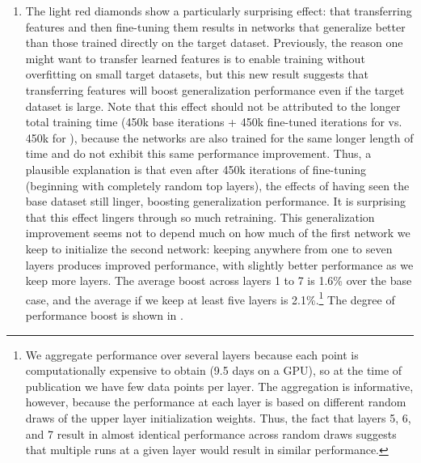 \begin{enumerate}[leftmargin=1.5em]
\item The light red  diamonds show a particularly surprising effect: that transferring features and then fine-tuning them results in networks that generalize better than those trained directly on the target dataset. Previously, the reason one might want to transfer learned features is to enable training without overfitting on small target datasets, but this new result suggests that transferring features will boost generalization performance even if the target dataset is large. Note that this effect should not be attributed to the longer total training time (450k base iterations + 450k fine-tuned iterations for  vs. 450k for ), because the  networks are also trained for the same longer length of time and do not exhibit this same performance improvement. Thus, a plausible explanation is that even after 450k iterations of fine-tuning (beginning with completely random top layers), the effects of having seen the base dataset still linger, boosting generalization performance. It is surprising that this effect lingers through so much retraining. This generalization improvement seems not to depend much on how much of the first network we keep to initialize the second network: keeping anywhere from one to seven layers produces improved performance, with slightly better performance as we keep more layers. The average boost across layers 1 to 7 is 1.6\% over the base case, and the average if we keep at least five layers is 2.1\%.\footnote{We aggregate performance over several layers because each point is computationally expensive to obtain (9.5 days on a GPU), so at the time of publication we have few data points per layer. The aggregation is informative, however, because the performance at each layer is based on different random draws of the upper layer initialization weights. Thus, the fact that layers 5, 6, and 7 result in almost identical performance across random draws suggests that multiple runs at a given layer would result in similar performance.} The degree of performance boost is shown in .

\end{enumerate}

%
% 
% 
% 


